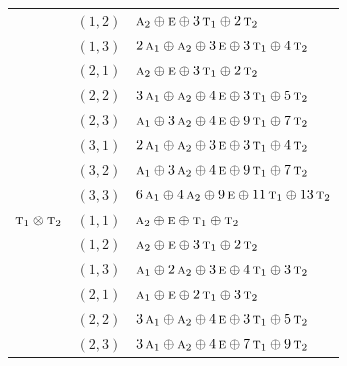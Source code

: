 \documentclass[11pt]{article}
\newcommand{\irr}[1]{\text{\normalfont\scshape #1}}
\begin{document}
\begin{longtable}{p{} c p{}}
 & $(1,2)$ & $\irr{a}_{2}\oplus \irr{e}\oplus 3\,\irr{t}_{1}\oplus 2\,\irr{t}_{2}$\\

 & $(1,3)$ & $2\,\irr{a}_{1}\oplus \irr{a}_{2}\oplus 3\,\irr{e}\oplus 3\,\irr{t}_{1}\oplus 4\,\irr{t}_{2}$\\

 & $(2,1)$ & $\irr{a}_{2}\oplus \irr{e}\oplus 3\,\irr{t}_{1}\oplus 2\,\irr{t}_{2}$\\

 & $(2,2)$ & $3\,\irr{a}_{1}\oplus \irr{a}_{2}\oplus 4\,\irr{e}\oplus 3\,\irr{t}_{1}\oplus 5\,\irr{t}_{2}$\\

 & $(2,3)$ & $\irr{a}_{1}\oplus 3\,\irr{a}_{2}\oplus 4\,\irr{e}\oplus 9\,\irr{t}_{1}\oplus 7\,\irr{t}_{2}$\\

 & $(3,1)$ & $2\,\irr{a}_{1}\oplus \irr{a}_{2}\oplus 3\,\irr{e}\oplus 3\,\irr{t}_{1}\oplus 4\,\irr{t}_{2}$\\

 & $(3,2)$ & $\irr{a}_{1}\oplus 3\,\irr{a}_{2}\oplus 4\,\irr{e}\oplus 9\,\irr{t}_{1}\oplus 7\,\irr{t}_{2}$\\

 & $(3,3)$ & $6\,\irr{a}_{1}\oplus 4\,\irr{a}_{2}\oplus 9\,\irr{e}\oplus 11\,\irr{t}_{1}\oplus 13\,\irr{t}_{2}$\\

\hline

$\irr{t}_{1}\otimes \irr{t}_{2}$ & $(1,1)$ & $\irr{a}_{2}\oplus \irr{e}\oplus \irr{t}_{1}\oplus \irr{t}_{2}$\\

 & $(1,2)$ & $\irr{a}_{2}\oplus \irr{e}\oplus 3\,\irr{t}_{1}\oplus 2\,\irr{t}_{2}$\\

 & $(1,3)$ & $\irr{a}_{1}\oplus 2\,\irr{a}_{2}\oplus 3\,\irr{e}\oplus 4\,\irr{t}_{1}\oplus 3\,\irr{t}_{2}$\\

 & $(2,1)$ & $\irr{a}_{1}\oplus \irr{e}\oplus 2\,\irr{t}_{1}\oplus 3\,\irr{t}_{2}$\\

 & $(2,2)$ & $3\,\irr{a}_{1}\oplus \irr{a}_{2}\oplus 4\,\irr{e}\oplus 3\,\irr{t}_{1}\oplus 5\,\irr{t}_{2}$\\

 & $(2,3)$ & $3\,\irr{a}_{1}\oplus \irr{a}_{2}\oplus 4\,\irr{e}\oplus 7\,\irr{t}_{1}\oplus 9\,\irr{t}_{2}$\\


\end{longtable}
\end{document}
